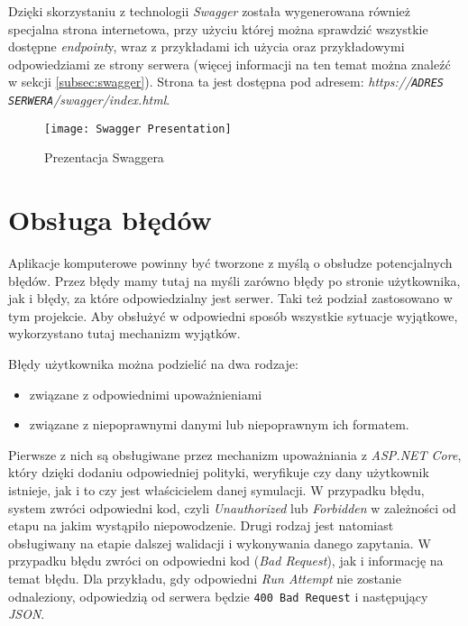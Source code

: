 \par Dzięki skorzystaniu z technologii \emph{Swagger} została wygenerowana również specjalna strona internetowa, przy użyciu której można sprawdzić wszystkie dostępne \emph{endpoint}y, wraz z przykładami ich użycia oraz przykładowymi odpowiedziami ze strony serwera (więcej informacji na ten temat można znaleźć w sekcji \ref{subsec:swagger}). Strona ta jest dostępna pod adresem: \emph{https://\texttt{ADRES SERWERA}/swagger/index.html}.

\begin{figure}[H]
	\texttt{[image: Swagger Presentation]}
	\caption{Prezentacja Swaggera}
\end{figure}

\section{Obsługa błędów}

\par Aplikacje komputerowe powinny być tworzone z myślą o obsłudze potencjalnych błędów. Przez błędy mamy tutaj na myśli zarówno błędy po stronie użytkownika, jak i błędy, za które odpowiedzialny jest serwer. Taki też podział zastosowano w tym projekcie. Aby obsłużyć w odpowiedni sposób wszystkie sytuacje wyjątkowe, wykorzystano tutaj mechanizm wyjątków.

\par Błędy użytkownika można podzielić na dwa rodzaje:
\begin{itemize}
	\item związane z odpowiednimi upoważnieniami
	\item związane z niepoprawnymi danymi lub niepoprawnym ich formatem.
\end{itemize}
Pierwsze z nich są obsługiwane przez mechanizm upoważniania z \emph{ASP.NET Core}, który dzięki dodaniu odpowiedniej polityki, weryfikuje czy dany użytkownik istnieje, jak i to czy jest właścicielem danej symulacji. W przypadku błędu, system zwróci odpowiedni kod, czyli \emph{Unauthorized} lub \emph{Forbidden} w zależności od etapu na jakim wystąpiło niepowodzenie. Drugi rodzaj jest natomiast obsługiwany na etapie dalszej walidacji i wykonywania danego zapytania. W przypadku błędu zwróci on odpowiedni kod (\emph{Bad Request}), jak i informację na temat błędu. Dla przykładu, gdy odpowiedni \emph{Run Attempt} nie zostanie odnaleziony, odpowiedzią od serwera będzie \texttt{400 Bad Request} i następujący \emph{JSON}.

